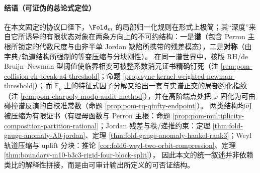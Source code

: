 \paragraph{结语（可证伪的总论式定位）}
在本文固定的协议口径下，\(\Fold_m\) 的局部归一化规则在形式上极简；其“深度”来自它所诱导的有限状态对象在两条方向上的不可约结构：一是\textbf{谱}（包含 Perron 主根所锁定的代数尺度与由非半单 Jordan 缺陷所携带的残差模态），二是\textbf{对称}（由字典/轨道结构所强制的等变压缩与分块刚性）。
在同一谱世界中，核版 RH/de Bruijn--Newman 型阈值使临界相变可被整系数消元证书精确钉死（注 \ref{rem:pom-collision-rh-break-a4-threshold}；命题 \ref{prop:sync-kernel-weighted-newman-threshold}）；而 \(\mathbb{F}_p\) 上的特征式因子分解又给出一套与实谱正交的局部约化指纹（注 \ref{rem:pom-charpoly-modp-audit-method}），并在高阶端点处把 \(\varphi\) 固化为可由碰撞谱反演的自校准常数（命题 \ref{prop:pom-rq-qinfty-endpoint}）。
两类结构均可被压缩为有限证书（有理母函数与 Perron 主根：命题 \ref{prop:pom-multiplicity-composition-partition-rational}；Jordan 残差与秩/递推约束：定理 \ref{thm:fold-gauge-anomaly-A0-jordan}、定理 \ref{thm:fold-gauge-anomaly-hankel-rank3}；Weyl 轨道压缩与 uplift 分块：推论 \ref{cor:fold6-weyl-two-orbit-compression}、定理 \ref{thm:boundary-m10-b3c3-rigid-four-block-split}），
因此本文的统一叙述并非依赖类比的解释性拼接，而是由可审计输出所定义的可否证结构。
